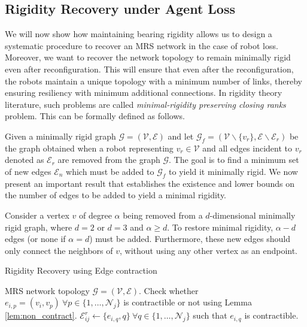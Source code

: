 \subsection{Rigidity Recovery under Agent Loss}
We will now show how maintaining bearing rigidity allows us to design a systematic procedure to recover an MRS network in the case of robot loss. Moreover, we want to recover the network topology to remain minimally rigid even after reconfiguration. This will ensure that even after the reconfiguration, the robots maintain a unique topology with a minimum number of links, thereby ensuring resiliency with minimum additional connections. In rigidity theory literature, such problems are called \textit{minimal-rigidity preserving closing ranks} problem. This can be formally defined as follows. 

Given a minimally rigid graph $\mathcal{G} = (\mathcal{V}, \mathcal{E})$ and let  $\mathcal{G}_f = (\mathcal{V} \backslash \{v_r\}, \mathcal{E} \backslash \mathcal{E}_r)$ be the graph obtained when a robot representing $v_r \in \mathcal{V}$ and all edges incident to $v_r$ denoted as $\mathcal{E}_r$ are removed from the graph $\mathcal{G}$. The goal is to find a minimum set of new edges $\mathcal{E}_n$ which must be added to $\mathcal{G}_f$ to yield it minimally rigid. We now present an important result that establishes the existence and lower bounds on the number of edges to be added to yield a minimal rigidity.
\begin{lemma}
\label{lem:closing_rank}
Consider a vertex $v$ of degree $\alpha$ being removed from a $d$-dimensional minimally rigid graph, where $d=2$ or $d=3$ and $\alpha\geq d$. To restore minimal rigidity, $\alpha - d$ edges (or none if $\alpha =d$) must be added. Furthermore, these new edges should only connect the neighbors of $v$, without using any other vertex as an endpoint.
\end{lemma}
\begin{algorithm}[t]
\caption{Rigidity Recovery using Edge contraction}\label{alg:recovery}
\begin{algorithmic}[1]
\Require MRS network topology $\mathcal{G} = (\mathcal{V}, \mathcal{E})$.
        \Return
        \Else
            \State Check whether $e_{i,p} = (v_i,v_p) \ \forall p \in \{1, \dots, \mathcal{N}_j\}$ is contractible or not using Lemma \ref{lem:non_contract}.
            \State $\mathcal{E}^r_{ij} \leftarrow \big\{e_{i,q}, q\big\}  \ \forall q \in \{1, \dots, \mathcal{N}_j\}$ such that $e_{i,q}$ is contractible. 
        \EndIf
    \EndFor
\EndFor
\end{algorithmic}
\end{algorithm}

